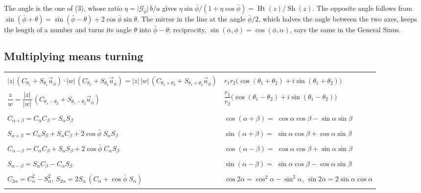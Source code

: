 \documentclass[11pt,a4paper]{amsart}
\makeatletter
\theoremstyle{plain}
\theoremstyle{definition}
\theoremstyle{remark}
\newcommand{\pb}{\bar{\phi}}                     %
\newcommand{\Gp}{\mathcal{G}_{\bar{\phi}}}       %
\newcommand{\up}{\vec{u}_{\bar{\phi}}}           %
\DeclareMathOperator{\Sh}{Sh}                    %
\DeclareMathOperator{\Ht}{Ht}                    %
\newcommand{\gnlaw}[3]{\multicolumn{2}{@{}l@{}}{\small\itshape #1}\\* #2 & #3 \\ \addlinespace[4pt]}
\newenvironment{gnlaws}{%
  \begin{longtable}{@{}>{\small\raggedright\arraybackslash}p{0.62\textwidth}@{\hspace{0.04\textwidth}}>{\small\raggedright\arraybackslash}p{0.32\textwidth}@{}}
  \toprule
  \multicolumn{1}{@{}l}{\textsc{in a relative plane}} & \multicolumn{1}{l@{}}{\textsc{the complex case}} \\
  \midrule
  \endhead
  \bottomrule
  \endlastfoot}
  {\end{longtable}}
\makeatother
\begin{document}
The angle is the one of (3), whose ratio $\eta = \lvert\Gp\rvert\,b/a$ gives $\eta\sin\pb/(1 + \eta\cos\pb) = \Ht(z)/\Sh(z)$. The opposite angle follows from $\sin(\pb + \theta) = \sin(\pb - \theta) + 2\cos\pb\sin\theta$. The mirror in the line at the angle $\pb/2$, which halves the angle between the two axes, keeps the length of a number and turns its angle $\theta$ into $\pb - \theta$; reciprocity, $\sin(\alpha, \phi) = \cos(\phi, \alpha)$, says the same in the General Sinus.

\subsection{Multiplying means turning}\label{app:turning}

\begin{gnlaws}
\gnlaw{product in polar form (\Cref{thm:turning})}
  {$\lvert z\rvert\,(C_{\theta_1} + S_{\theta_1}\up) \cdot \lvert w\rvert\,(C_{\theta_2} + S_{\theta_2}\up) = \lvert z\rvert\,\lvert w\rvert\,(C_{\theta_1 + \theta_2} + S_{\theta_1 + \theta_2}\up)$}
  {$r_1r_2\bigl(\cos(\theta_1 + \theta_2) + i\sin(\theta_1 + \theta_2)\bigr)$}
\gnlaw{quotient in polar form (\Cref{thm:turning})}
  {$\dfrac{z}{w} = \dfrac{\lvert z\rvert}{\lvert w\rvert}\,(C_{\theta_1 - \theta_2} + S_{\theta_1 - \theta_2}\up)$}
  {$\dfrac{r_1}{r_2}\bigl(\cos(\theta_1 - \theta_2) + i\sin(\theta_1 - \theta_2)\bigr)$}
\gnlaw{addition along the Composer axis, cosine (\Cref{thm:turning})}
  {$C_{\alpha + \beta} = C_\alpha C_\beta - S_\alpha S_\beta$}
  {$\cos(\alpha + \beta) = {}$ \newline $\cos\alpha\cos\beta - \sin\alpha\sin\beta$}
\gnlaw{addition along the Composer axis, sine (\Cref{thm:turning})}
  {$S_{\alpha + \beta} = C_\alpha S_\beta + S_\alpha C_\beta + 2\cos\pb\;S_\alpha S_\beta$}
  {$\sin(\alpha + \beta) = {}$ \newline $\sin\alpha\cos\beta + \cos\alpha\sin\beta$}
\gnlaw{subtraction, cosine}
  {$C_{\alpha - \beta} = C_\alpha C_\beta + S_\alpha S_\beta + 2\cos\pb\;C_\alpha S_\beta$}
  {$\cos(\alpha - \beta) = {}$ \newline $\cos\alpha\cos\beta + \sin\alpha\sin\beta$}
\gnlaw{subtraction, sine}
  {$S_{\alpha - \beta} = S_\alpha C_\beta - C_\alpha S_\beta$}
  {$\sin(\alpha - \beta) = {}$ \newline $\sin\alpha\cos\beta - \cos\alpha\sin\beta$}
\gnlaw{double angle}
  {$C_{2\alpha} = C_\alpha^2 - S_\alpha^2$, \quad $S_{2\alpha} = 2S_\alpha\,(C_\alpha + \cos\pb\;S_\alpha)$}
  {$\cos 2\alpha = \cos^2\alpha - \sin^2\alpha$, \newline $\sin 2\alpha = 2\sin\alpha\cos\alpha$}

\end{gnlaws}
\end{document}
